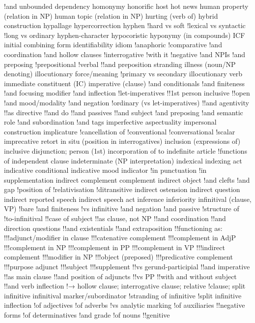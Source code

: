!and unbounded dependency
homonymy
honorific
host
hot news
human property (relation in NP)
human topic (relation in NP)
hurting (verb of)
hybrid construction
hypallage
hypercorrection
hyphen
!hard vs soft
!lexical vs syntactic
!long vs ordinary
hyphen-character
hypocoristic
hyponymy (in compounds)
ICF initial combining form
identifiability
idiom
!anaphoric
!comparative
!and coordination
!and hollow clauses
!interrogative
!with it
!negative
!and NPIs
!and preposing
!prepositional
!verbal
!!and preposition stranding
illness (noun/NP denoting)
illocutionary force/meaning
!primary vs secondary
illocutionary verb
immediate constituent (IC)
imperative (clause)
!and conditionals
!and finiteness
!and focusing modifier
!and inflection
!let-imperatives
!!1st person inclusive
!!open
!and mood/modality
!and negation
!ordinary (vs let-imperatives)
!!and agentivity
!!as directive
!!and do
!!and passives
!!and subject
!and preposing
!and semantic role
!and subordination
!and tags
imperfective aspectuality
impersonal construction
implicature
!cancellation of
!conventional
!conversational
!scalar
imprecative retort
in situ (position in interrogatives)
inclusion (expressions of)
inclusive disjunction; person (1st)
incorporation of to
indefinite article
!functions of
independent clause
indeterminate (NP interpretation)
indexical
indexing act
indicative conditional
indicative mood
indicator
!in punctuation
!in supplementation
indirect complement complement
indirect object
!and clefts
!and gap
!position of
!relativisation
!ditransitive
indirect ostension
indirect question
indirect reported speech
indirect speech act
inference
inferiority
infinitival (clause, VP)
!bare
!and finiteness
!vs infinitive
!and negation
!and passive
!structure of
!to-infinitival
!!case of subject
!!as clause, not NP
!!and coordination
!!and direction questions
!!and existentials
!!and extraposition
!!functioning as:
!!!adjunct/modifier in clause
!!!catenative complement
!!!complement in AdjP
!!!complement in NP
!!!complement in PP
!!!complement in VP
!!!indirect complement
!!!modifier in NP
!!!object (preposed)
!!!predicative complement
!!!purpose adjunct
!!!subject
!!!supplement
!!vs gerund-participial
!!and imperative
!!as main clause
!!and position of adjuncts
!!vs PP
!!with and without subject
!!and verb inflection
!→ hollow clause; interrogative clause; relative
!clause; split infinitive
infinitival marker/subordinator
!stranding of
infinitive
!split infinitive
inflection
!of adjectives
!of adverbs
!vs analytic marking
!of auxiliaries
!!negative forms
!of determinatives
!and grade
!of nouns
!!genitive
